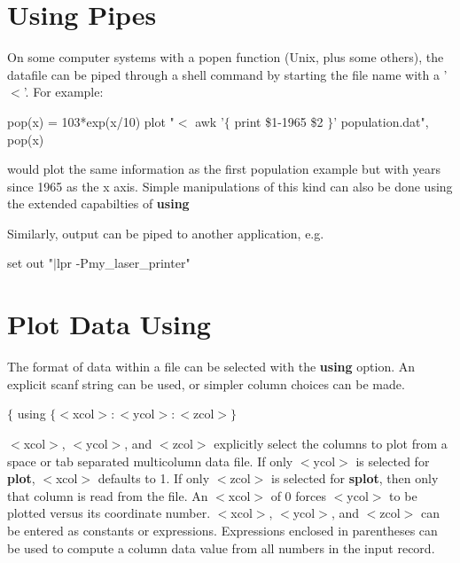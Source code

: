 \section{Using Pipes}

On some computer systems with a popen function (Unix, plus some
others), the datafile can be piped through a shell command by starting
the file name with a '$<$'.  For example:

        pop(x) = 103*exp(x/10)
        plot "$<$ awk '$\{$ print \$1-1965 \$2 $\}$' population.dat", pop(x)

would plot the same information as the first population example
but with years since 1965 as the x axis.  Simple manipulations
of this kind can also be done using the extended capabilties of {\bf using}

Similarly, output can be piped to another application, e.g.

        set out "$|$lpr -Pmy\_laser\_printer"

\section{Plot Data Using}
The format of data within a file can be selected with the {\bf using}
option. An explicit scanf string can be used, or simpler column
choices can be made.


{$\{$ using $\{ <$xcol$>:<$ycol$>:<$zcol$> \}$}

$<$xcol$>$, $<$ycol$>$, and $<$zcol$>$ explicitly select the columns
to plot from a space or tab separated multicolumn data file. If only
$<$ycol$>$ is selected for {\bf plot}, $<$xcol$>$ defaults to 1. If
only $<$zcol$>$ is selected for {\bf splot}, then only that column is
read from the file. An $<$xcol$>$ of 0 forces $<$ycol$>$ to be plotted
versus its coordinate number. $<$xcol$>$, $<$ycol$>$, and $<$zcol$>$
can be entered as constants or expressions.  Expressions enclosed in
parentheses can be used to compute a column data value from all
numbers in the input record.


